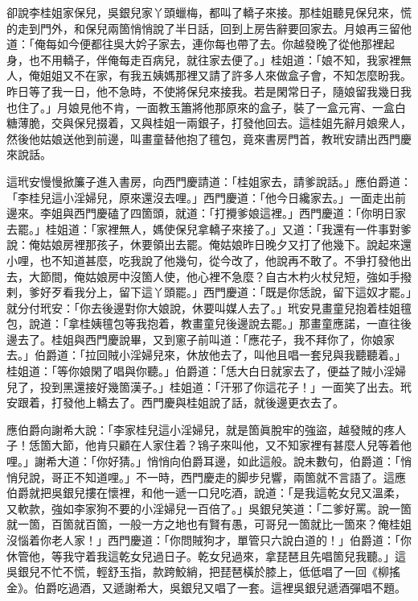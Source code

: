 卻說李桂姐家保兒，吳銀兒家丫頭蠟梅，都叫了轎子來接。那桂姐聽見保兒來，慌的走到門外，和保兒兩箇悄悄說了半日話，回到上房告辭要回家去。月娘再三留他道：「俺每如今便都往吳大妗子家去，連你每也帶了去。你越發晚了從他那裡起身，也不用轎子，伴俺每走百病兒，就往家去便了。」桂姐道：「娘不知，我家裡無人，俺姐姐又不在家，有我五姨媽那裡又請了許多人來做盒子會，不知怎麼盼我。昨日等了我一日，他不急時，不使將保兒來接我。若是閑常日子，隨娘留我幾日我也住了。」月娘見他不肯，一面教玉簫將他那原來的盒子，裝了一盒元宵、一盒白糖薄脆，交與保兒掇着，又與桂姐一兩銀子，打發他回去。這桂姐先辭月娘衆人，然後他姑娘送他到前邊，叫畫童替他抱了氊包，竟來書房門首，教玳安請出西門慶來說話。

這玳安慢慢掀簾子進入書房，向西門慶請道：「桂姐家去，請爹說話。」應伯爵道：「李桂兒這小淫婦兒，原來還沒去哩。」西門慶道：「他今日纔家去。」一面走出前邊來。李姐與西門慶磕了四箇頭，就道：「打攪爹娘這裡。」西門慶道：「你明日家去罷。」桂姐道：「家裡無人，媽使保兒拿轎子來接了。」又道：「我還有一件事對爹說：俺姑娘房裡那孩子，休要領出去罷。俺姑娘昨日晚夕又打了他幾下。說起來還小哩，也不知道甚麼，吃我說了他幾句，從今改了，他說再不敢了。不爭打發他出去，大節間，俺姑娘房中沒箇人使，他心裡不急麼？自古木杓火杖兒短，強如手撥剌，爹好歹看我分上，留下這丫頭罷。」西門慶道：「既是你恁說，留下這奴才罷。」就分付玳安：「你去後邊對你大娘說，休要叫媒人去了。」玳安見畫童兒抱着桂姐氊包，說道：「拿桂姨氊包等我抱着，教畫童兒後邊說去罷。」那畫童應諾，一直往後邊去了。桂姐與西門慶說畢，又到窻子前叫道：「應花子，我不拜你了，你娘家去。」伯爵道：「拉回賊小淫婦兒來，休放他去了，叫他且唱一套兒與我聽聽着。」桂姐道：「等你娘閑了唱與你聽。」伯爵道：「恁大白日就家去了，便益了賊小淫婦兒了，投到黑還接好幾箇漢子。」桂姐道：「汗邪了你這花子！」一面笑了出去。玳安跟着，打發他上轎去了。西門慶與桂姐說了話，就後邊更衣去了。

應伯爵向謝希大說：「李家桂兒這小淫婦兒，就是箇眞脫牢的強盜，越發賊的疼人子！恁箇大節，他肯只顧在人家住着？鴇子來叫他，又不知家裡有甚麼人兒等着他哩。」謝希大道：「你好猜。」悄悄向伯爵耳邊，如此這般。說未數句，伯爵道：「悄悄兒說，哥正不知道哩。」{}不一時，西門慶走的脚步兒響，兩箇就不言語了。這應伯爵就把吳銀兒摟在懷裡，和他一遞一口兒吃酒，說道：「是我這乾女兒又溫柔，又軟款，強如李家狗不要的小淫婦兒一百倍了。」吳銀兒笑道：「二爹好罵。說一箇就一箇，百箇就百箇，一般一方之地也有賢有愚，可哥兒一箇就比一箇來？俺桂姐沒惱着你老人家！」西門慶道：「你問賊狗才，單管只六說白道的！」伯爵道：「你休管他，等我守着我這乾女兒過日子。乾女兒過來，拿琵琶且先唱箇兒我聽。」這吳銀兒不忙不慌，輕舒玉指，款跨鮫綃，把琵琶橫於膝上，低低唱了一回《柳搖金》。伯爵吃過酒，又遞謝希大，吳銀兒又唱了一套。這裡吳銀兒遞酒彈唱不題。

